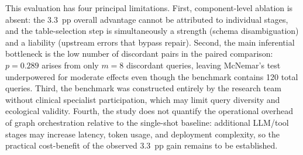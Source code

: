 \documentclass[conference]{IEEEtran}
\begin{document}

This evaluation has four principal limitations. First, component-level ablation is absent: the 3.3~pp overall advantage cannot be attributed to individual stages, and the table-selection step is simultaneously a strength (schema disambiguation) and a liability (upstream errors that bypass repair). Second, the main inferential bottleneck is the low number of discordant pairs in the paired comparison: $p{=}0.289$ arises from only $m{=}8$ discordant queries, leaving McNemar's test underpowered for moderate effects even though the benchmark contains 120 total queries. Third, the benchmark was constructed entirely by the research team without clinical specialist participation, which may limit query diversity and ecological validity. Fourth, the study does not quantify the operational overhead of graph orchestration relative to the single-shot baseline: additional LLM/tool stages may increase latency, token usage, and deployment complexity, so the practical cost-benefit of the observed 3.3~pp gain remains to be established.





\end{document}
